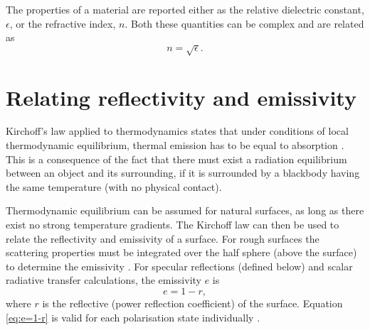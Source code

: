  The properties of a material are reported either as the relative
 dielectric constant, $\epsilon$, or the refractive index, $n$. Both
 these quantities can be complex and are related as
 \begin{equation}
   \label{eq:surface_eps2n}
   n = \sqrt{\epsilon}.
 \end{equation}


\section{Relating reflectivity and emissivity}
 \label{sec:surface:surface:ref2emi}
 
 Kirchoff's law applied to thermodynamics states that under conditions
 of local thermodynamic equilibrium, thermal emission has to be equal
 to absorption \citep[page 215]{ulaby:81}. This is a consequence of
 the fact that there must exist a radiation equilibrium between an
 object and its surrounding, if it is surrounded by a blackbody having
 the same temperature (with no physical contact). 
 
 Thermodynamic equilibrium can be assumed for natural surfaces, as
 long as there exist no strong temperature gradients. The Kirchoff law
 can then be used to relate the reflectivity and emissivity of a
 surface. For rough surfaces the scattering properties must be
 integrated over the half sphere (above the surface) to determine the
 emissivity \citep[see e.g.][Eq.\ 4.186]{ulaby:81}. For specular
 reflections (defined below) and scalar radiative transfer
 calculations, the emissivity $e$ is
 \begin{equation}
  \label{eq:e=1-r}
   e = 1 - r,
 \end{equation}
 where $r$ is the reflective (power reflection coefficient) of the
 surface.  Equation \ref{eq:e=1-r} is valid for each polarisation state
 individually \citep[Eq.\ 4.190a]{ulaby:81}.

